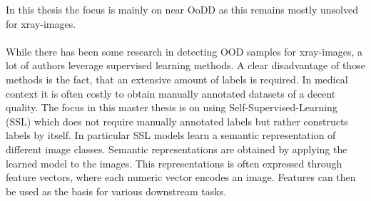 In this thesis the focus is mainly on near OoDD as this remains mostly unsolved for xray-images.
\\
\\
While there has been some research in detecting OOD samples for xray-images, a lot of authors leverage supervised learning methods.
A clear disadvantage of those methods is the fact, that an extensive amount of labels is required.
In medical context it is often costly to obtain manually annotated datasets of a decent quality.
The focus in this master thesis is on using Self-Supervised-Learning (SSL) which does not require manually annotated labels but rather constructs labels by itself. 
In particular SSL models learn a semantic representation of different image classes.
Semantic representations are obtained by applying the learned model to the images.
This representations is often expressed through feature vectors, where each numeric vector encodes an image.
Features can then be used as the basis for various downstream tasks.